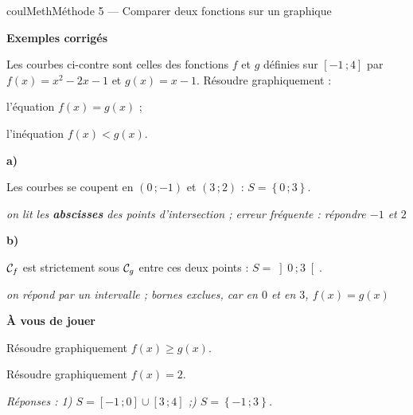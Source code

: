 \documentclass[11pt,a4paper]{article}
\makeatletter
\renewcommand{\ge}{\geqslant}
\newcommand{\lycee@repere}[4]{%
  \draw[grille,step=1] (#1,#2) grid (#3,#4);
  \draw[-{Stealth[length=2mm]},thick] (#1,0)--({#3+0.4},0) node[below left=-1pt]{$x$};
  \draw[-{Stealth[length=2mm]},thick] (0,#2)--(0,{#4+0.4}) node[below left=-1pt]{$y$};
  \node[below left,font=\scriptsize,inner sep=1.5pt] at (0,0) {$0$};}
\newcommand{\lycee@gradx}[1]{\foreach \k/\l in {#1}{%
  \draw (\k,0.07)--(\k,-0.07) node[below,font=\scriptsize,inner sep=1.5pt]{$\l$};}}
\newcommand{\lycee@grady}[1]{\foreach \k/\l in {#1}{%
  \draw (0.07,\k)--(-0.07,\k) node[left,font=\scriptsize,inner sep=1.5pt]{$\l$};}}
\newcommand{\lycee@intff}[2]{\left[#1\,;#2\right]}
\newcommand{\lycee@intoo}[2]{\left]#1\,;#2\right[}
\newcommand{\lycee@ens}[1]{\left\{#1\right\}}
\providecommand{\repere}{\lycee@repere}%
\providecommand{\gradx}{\lycee@gradx}%
\providecommand{\grady}{\lycee@grady}%
\providecommand{\Cf}{\mathcal{C}\sb{f}}%
\providecommand{\Cg}{\mathcal{C}\sb{g}}%
\providecommand{\intff}{\lycee@intff}%
\providecommand{\intoo}{\lycee@intoo}%
\providecommand{\ens}{\lycee@ens}}
\newcounter{lycee@signet}
\newcommand{\signet}[3][]{\stepcounter{lycee@signet}%
  \edef\lycee@dest{\if\relax\detokenize{#1}\relax
    signet.\arabic{lycee@signet}\else#1\fi}%
  \hypertarget{\lycee@dest}{}\bookmark[level=#2,dest=\lycee@dest]{#3}}
\newcommand{\res}[1]{#1}
\newcounter{methode}
\newenvironment{methodebox}[1][Méthode]{\stepcounter{methode}%
  \begin{boitecours}[phantom={\signet[methode-\arabic{methode}]{2}{#1}}]{coulMeth}{#1}}%
  {\end{boitecours}}
\newcommand{\etape}[1]{\par\smallskip\textbf{\color{coulMeth}#1}\par\nobreak\smallskip}
\newcommand{\reponse}[1]{\par\smallskip
  {\footnotesize\itshape\color{black!55}Réponses : #1}}
\newcommand{\explique}[2]{\par\smallskip\noindent
  \begin{minipage}[t]{0.57\linewidth}\raggedright #1\end{minipage}\hfill
  \begin{minipage}[t]{0.40\linewidth}\raggedright\leavevmode
    {\small\itshape\color{black!60}#2}\end{minipage}\par}
\newcommand{\cas}[1]{\par\smallskip\noindent\textbf{\color{coulExo}#1}\vadjust{\nobreak}}
\newenvironment{correction}{\par}{\par}
\newcommand{\etapeexemples}{\etape{Exemples corrigés}}
\makeatother
\begin{document}
\begin{methodebox}[Méthode 5 --- Comparer deux fonctions sur un graphique]
\etapeexemples
\begin{minipage}[t]{0.58\linewidth}\raggedright
\vspace{0pt}
Les courbes ci-contre sont celles des fonctions $f$ et $g$ définies sur $\intff{-1}{4}$ par
$f(x)=x^{2}-2x-1$ et $g(x)=x-1$. Résoudre graphiquement :
\begin{questions}[label=\alph*)]
  \item l'équation $f(x)=g(x)$ ;
  \item l'inéquation $f(x)<g(x)$.
\end{questions}
\end{minipage}\hfill
\begin{minipage}[t]{0.38\linewidth}\centering
\vspace{0pt}
\end{minipage}

\begin{correction}
\cas{a)}
\explique{Les courbes se coupent en $(0\,;-1)$ et $(3\,;2)$ : $S=\res{\ens{0\,;3}}$.}{on lit
les \textbf{abscisses} des points d'intersection ; erreur fréquente : répondre $-1$ et
$2$}
\cas{b)}
\explique{$\Cf$ est strictement sous $\Cg$ entre ces deux points : $S=\res{\intoo{0}{3}}$.}{on
répond par un intervalle ; bornes exclues, car en $0$ et en $3$, $f(x)=g(x)$}
\end{correction}

\etape{À vous de jouer}
\begin{questions}
  \item Résoudre graphiquement $f(x)\ge g(x)$.
  \item Résoudre graphiquement $f(x)=2$.
\end{questions}
\reponse{1\textdegree) $S=\intff{-1}{0}\cup\intff{3}{4}$ ;\textdegree) $S=\ens{-1\,;3}$.}
\end{methodebox}
\end{document}
